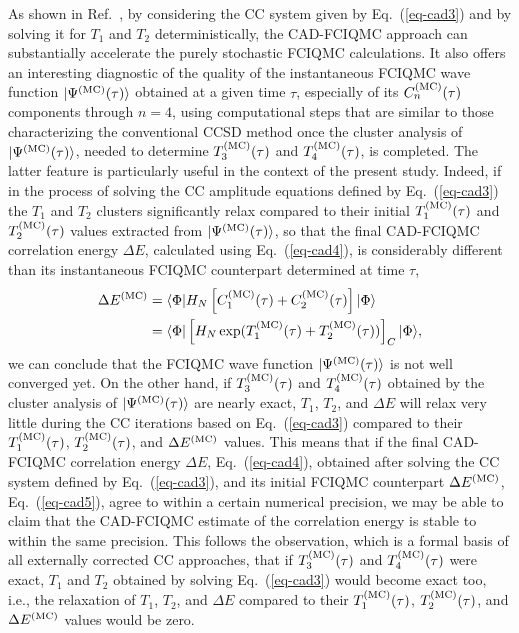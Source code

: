 \documentclass[journal=jcp,manuscript=suppinfo]{achemso}
\begin{document}
As shown in Ref.\ , by considering the CC system given by Eq.\ (\ref{eq-cad3})
and by solving it for $T_{1}$ and $T_{2}$ deterministically, the CAD-FCIQMC approach can substantially
accelerate the purely stochastic FCIQMC calculations. It also offers an interesting diagnostic of the quality
of the instantaneous FCIQMC wave function $|\Psi^{\rm (MC)}(\tau)\rangle$ obtained at a given time $\tau$,
especially of its $C_{n}^{\rm (MC)}(\tau)$ components through $n=4$, using computational steps that are
similar to those characterizing the conventional CCSD method\cite{piecuch_ccsd}
once the cluster analysis of $|\Psi^{\rm (MC)}(\tau)\rangle$, needed to determine
$T_{3}^{\rm (MC)}(\tau)$ and $T_{4}^{\rm (MC)}(\tau)$, is completed.
The latter feature is particularly useful in the context
of the present study. Indeed, if in the process of solving the CC amplitude equations defined
by Eq.\ (\ref{eq-cad3}) the $T_{1}$ and $T_{2}$ clusters significantly relax compared to their initial
$T_{1}^{\rm (MC)}(\tau)$ and $T_{2}^{\rm (MC)}(\tau)$ values extracted from
$|\Psi^{\rm (MC)}(\tau)\rangle$, so that the final CAD-FCIQMC correlation energy $\Delta E$,
calculated using Eq.\ (\ref{eq-cad4}),
is considerably different than its instantaneous FCIQMC counterpart determined at time $\tau$,
\begin{equation}
\begin{split}
\Delta E^{\rm (MC)}
& = \langle \Phi | H_{N} \left[ C_{1}^{\rm (MC)}(\tau) + C_{2}^{\rm (MC)}(\tau) \right] |\Phi\rangle \\
& = \langle \Phi | \left[ H_{N} \exp(T_{1}^{\rm (MC)}(\tau) + T_{2}^{\rm (MC)}(\tau)) \right]_{C} |\Phi\rangle ,
\end{split}
\label{eq-cad5}
\end{equation}
we can conclude that the FCIQMC wave function $|\Psi^{\rm (MC)}(\tau)\rangle$
is not well converged yet. On the other hand,
if $T_{3}^{\rm (MC)}(\tau)$ and $T_{4}^{\rm (MC)}(\tau)$ obtained by the cluster analysis of
$|\Psi^{\rm (MC)}(\tau)\rangle$ are nearly exact, $T_{1}$, $T_{2}$, and $\Delta E$
will relax very little during the CC iterations based on Eq.\ (\ref{eq-cad3}) compared
to their $T_{1}^{\rm (MC)}(\tau)$, $T_{2}^{\rm (MC)}(\tau)$, and $\Delta E^{\rm (MC)}$ values.
This means that if the final CAD-FCIQMC correlation energy $\Delta E$, Eq.\ (\ref{eq-cad4}), obtained
after solving the CC system defined by Eq.\ (\ref{eq-cad3}), and its initial FCIQMC counterpart
$\Delta E^{\rm (MC)}$, Eq.\ (\ref{eq-cad5}), agree to within a certain numerical precision, we may be able to
claim that the CAD-FCIQMC estimate of the correlation energy is stable to within the same precision.
This follows the observation, which is a formal basis of all externally corrected CC approaches, that if
$T_{3}^{\rm (MC)}(\tau)$ and $T_{4}^{\rm (MC)}(\tau)$ were exact, $T_{1}$ and $T_{2}$ obtained by solving
Eq.\ (\ref{eq-cad3}) would become exact too, i.e., the relaxation of $T_{1}$, $T_{2}$, and $\Delta E$ compared
to their $T_{1}^{\rm (MC)}(\tau)$, $T_{2}^{\rm (MC)}(\tau)$, and $\Delta E^{\rm (MC)}$ values would be zero.
\end{document}
